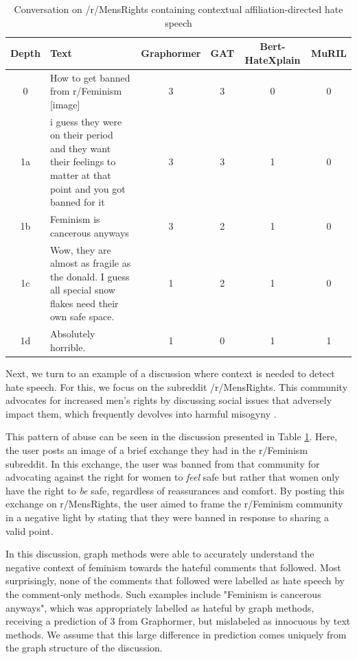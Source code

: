 \documentclass[letterpaper]{article} %
\newcommand{\edit}[1]{{#1}}
\begin{document}
\begin{table}
    \centering
        \caption{Conversation on /r/MensRights containing contextual affiliation-directed hate speech}
    \begin{tabular}{c|p{8cm}|c|c|c|c}
        Depth & Text & Graphormer & GAT & Bert-HateXplain & MuRIL \\
        \hline
        \hline
        0 & How to get banned from r/Feminism [image] & 3 & 3 & 0 & 0 \\
        \hline
        1a & i guess they were on their period and they want their feelings to matter at that point and you got banned for it & 3 & 3 & 1 & 0  \\
        \hline
        1b & Feminism is cancerous anyways & 3 & 2 & 1 & 0  \\
        \hline
        1c & Wow, they are almost as fragile as the donald. I guess all special snow flakes need their own safe space. & 1 & 2 & 1 & 0 \\
        \hline
        1d & Absolutely horrible. & 1 & 0 & 1 & 1 \\
    \end{tabular}
    \label{tab:contextual-mens-rights}
\end{table}
Next, we turn to an example of a discussion where context is needed to detect hate speech. \edit{For this, we focus on the subreddit /r/MensRights.  This community advocates for increased men's rights by discussing social issues that adversely impact them, which frequently devolves into harmful misogyny \cite{socsci5020018}}.

This pattern of abuse can be seen in the discussion presented in Table \ref{tab:contextual-mens-rights}. Here, the user posts an image of a brief exchange they had in the r/Feminism subreddit. In this exchange, the user was banned from that community for advocating against the right for women to \textit{feel} safe but rather that women only have the right to \textit{be} safe, regardless of reassurances and comfort. By posting this exchange on r/MensRights, the user aimed to frame the r/Feminism community in a negative light by stating that they were banned in response to sharing a valid point.

In this discussion, graph methods were able to accurately understand the negative context of feminism towards the hateful comments that followed. Most surprisingly, none of the comments that followed were labelled as hate speech by the comment-only methods. Such examples include "Feminism is cancerous anyways", which was appropriately labelled as hateful by graph methods, receiving a prediction of 3 from Graphormer, but mislabeled as innocuous by text methods. We assume that this large difference in prediction comes uniquely from the graph structure of the discussion.
\end{document}
